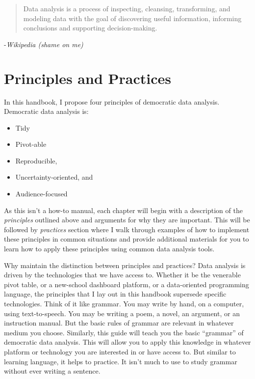 \documentclass[]{book}
\providecommand{\tightlist}{%
  \setlength{\itemsep}{0pt}\setlength{\parskip}{0pt}}
\begin{document}
\begin{quote}
Data analysis is a process of inspecting, cleansing, transforming, and modeling data with the goal of discovering useful information, informing conclusions and supporting decision-making.
\end{quote}

-\emph{Wikipedia (shame on me)}

\hypertarget{principles-and-practices}{%
\section{Principles and Practices}\label{principles-and-practices}}

In this handbook, I propose four principles of democratic data analysis. Democratic data analysis is:

\begin{itemize}
\tightlist
\item
  Tidy
\item
  Pivot-able
\item
  Reproducible,
\item
  Uncertainty-oriented, and
\item
  Audience-focused
\end{itemize}

As this isn't a how-to manual, each chapter will begin with a description of the \emph{principles} outlined above and arguments for why they are important. This will be followed by \emph{practices} section where I walk through examples of how to implement these principles in common situations and provide additional materials for you to learn how to apply these principles using common data analysis tools.

Why maintain the distinction between principles and practices? Data analysis is driven by the technologies that we have access to. Whether it be the venerable pivot table, or a new-school dashboard platform, or a data-oriented programming language, the principles that I lay out in this handbook supersede specific technologies. Think of it like grammar. You may write by hand, on a computer, using text-to-speech. You may be writing a poem, a novel, an argument, or an instruction manual. But the basic rules of grammar are relevant in whatever medium you choose. Similarly, this guide will teach you the basic ``grammar'' of democratic data analysis. This will allow you to apply this knowledge in whatever platform or technology you are interested in or have access to. But similar to learning language, it helps to practice. It isn't much to use to study grammar without ever writing a sentence.
\end{document}
